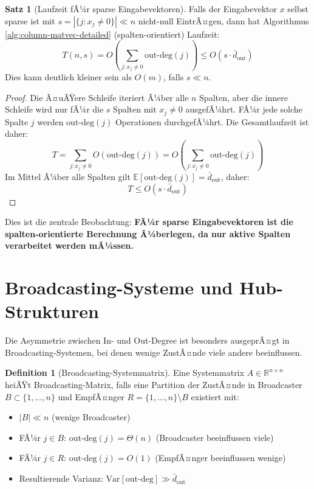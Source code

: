 ﻿\documentclass[a4paper,12pt]{report}
\theoremstyle{definition}
\newtheorem{definition}{Definition}
\newtheorem{satz}{Satz}
\begin{document}
	\begin{satz}[Laufzeit fÃ¼r sparse Eingabevektoren]
		Falls der Eingabevektor $x$ selbst sparse ist mit $s = |\{j : x_j \neq 0\}| \ll n$ nicht-null EintrÃ¤gen, dann hat Algorithmus \ref{alg:column-matvec-detailed} (spalten-orientiert) Laufzeit:
		\[
		T(n,s) = O\left(\sum_{j: x_j \neq 0} \text{out-deg}(j)\right) \leq O(s \cdot \bar{d}_{\text{out}})
		\]
		Dies kann deutlich kleiner sein als $O(m)$, falls $s \ll n$.
	\end{satz}
	
	\begin{proof}
		Die Ã¤uÃŸere Schleife iteriert Ã¼ber alle $n$ Spalten, aber die innere Schleife wird nur fÃ¼r die $s$ Spalten mit $x_j \neq 0$ ausgefÃ¼hrt. FÃ¼r jede solche Spalte $j$ werden $\text{out-deg}(j)$ Operationen durchgefÃ¼hrt. Die Gesamtlaufzeit ist daher:
		\[
		T = \sum_{j: x_j \neq 0} O(\text{out-deg}(j)) = O\left(\sum_{j: x_j \neq 0} \text{out-deg}(j)\right)
		\]
		Im Mittel Ã¼ber alle Spalten gilt $\mathbb{E}[\text{out-deg}(j)] = \bar{d}_{\text{out}}$, daher:
		\[
		T \leq O(s \cdot \bar{d}_{\text{out}})
		\]
	\end{proof}
	
	Dies ist die zentrale Beobachtung: \textbf{FÃ¼r sparse Eingabevektoren ist die spalten-orientierte Berechnung Ã¼berlegen, da nur aktive Spalten verarbeitet werden mÃ¼ssen.}
	
	\section{Broadcasting-Systeme und Hub-Strukturen}
	
	Die Asymmetrie zwischen In- und Out-Degree ist besonders ausgeprÃ¤gt in Broadcasting-Systemen, bei denen wenige ZustÃ¤nde viele andere beeinflussen.
	
	\begin{definition}[Broadcasting-Systemmatrix]
		Eine Systemmatrix $A \in \mathbb{R}^{n \times n}$ heiÃŸt Broadcasting-Matrix, falls eine Partition der ZustÃ¤nde in Broadcaster $B \subset \{1,\ldots,n\}$ und EmpfÃ¤nger $R = \{1,\ldots,n\} \setminus B$ existiert mit:
		\begin{itemize}
			\item $|B| \ll n$ (wenige Broadcaster)
			\item FÃ¼r $j \in B$: $\text{out-deg}(j) = \Theta(n)$ (Broadcaster beeinflussen viele)
			\item FÃ¼r $j \in R$: $\text{out-deg}(j) = O(1)$ (EmpfÃ¤nger beeinflussen wenige)
			\item Resultierende Varianz: $\text{Var}[\text{out-deg}] \gg \bar{d}_{\text{out}}$
		\end{itemize}
	\end{definition}
	
\end{document}
